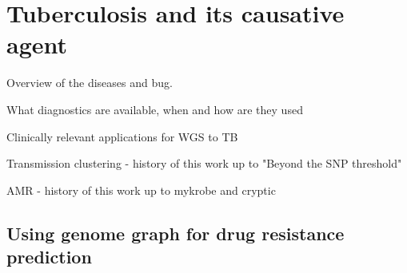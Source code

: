 \section{Tuberculosis and its causative agent}

Overview of the diseases and bug.

What diagnostics are available, when and how are they used

Clinically relevant applications for WGS to TB

Transmission clustering - history of this work up to "Beyond the SNP threshold"

AMR - history of this work up to mykrobe and cryptic

\subsection{Using genome graph for drug resistance prediction}
\label{sec:genome-graphs-dst}


